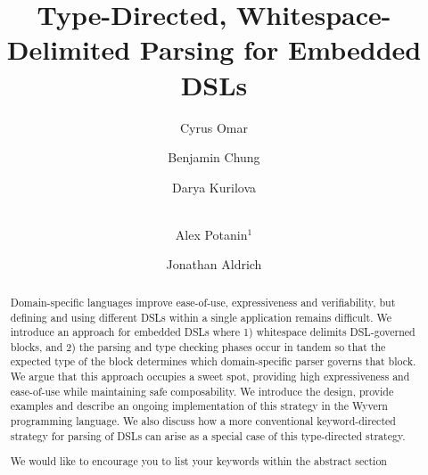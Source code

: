 \documentclass[runningheads,a4paper]{llncs}
\newcommand{\keywords}[1]{\par\addvspace\baselineskip
\noindent\keywordname\enspace\ignorespaces#1}
\begin{document}
\title{Type-Directed, Whitespace-Delimited Parsing for Embedded DSLs}

\author{Cyrus Omar \and Benjamin Chung \and Darya Kurilova \and\\
Alex Potanin$^{1}$ \and Jonathan Aldrich}

\maketitle


\begin{abstract}

Domain-specific languages improve ease-of-use, expressiveness and
verifiability, 
but defining and using different 
DSLs within a single application remains difficult.  
We introduce an approach for embedded DSLs where 1) whitespace delimits DSL-governed blocks, and 2) the parsing and type checking phases occur in tandem so that the expected type of the block determines which domain-specific parser governs that block.
We argue that this approach occupies a sweet spot, providing   
high expressiveness and ease-of-use while maintaining safe composability. We introduce the design, provide examples and describe an ongoing implementation of this strategy in the Wyvern programming language. We also discuss how a more conventional keyword-directed strategy for parsing of DSLs can arise as a special case of this type-directed strategy.

\keywords{We would like to encourage you to list your keywords within
the abstract section}
\end{abstract}











\end{document}
